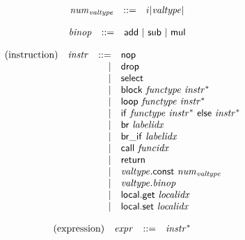 \documentclass{article}
\begin{document}
\vspace{1ex}

$$
\begin{array}{@{}lrrl@{}l@{}}
	& {{\mathit{num}}}_{{\mathit{valtype}}} &::=& {i}{{|{\mathit{valtype}}|}} \\
\end{array}
$$

\vspace{1ex}

$$
\begin{array}{@{}lrrl@{}l@{}}
	& {\mathit{binop}} &::=& \mathsf{add} ~|~ \mathsf{sub} ~|~ \mathsf{mul} \\
\end{array}
$$

\vspace{1ex}

$$
\begin{array}{@{}lrrl@{}l@{}}
	\mbox{(instruction)} & {\mathit{instr}} &::=& \mathsf{nop} \\ &&|&
	\mathsf{drop} \\ &&|&
	\mathsf{select} \\ &&|&
	\mathsf{block}~{\mathit{functype}}~{{\mathit{instr}}^\ast} \\ &&|&
	\mathsf{loop}~{\mathit{functype}}~{{\mathit{instr}}^\ast} \\ &&|&
	\mathsf{if}~{\mathit{functype}}~{{\mathit{instr}}^\ast}~\mathsf{else}~{{\mathit{instr}}^\ast} \\ &&|&
	\mathsf{br}~{\mathit{labelidx}} \\ &&|&
	\mathsf{br\_if}~{\mathit{labelidx}} \\ &&|&
	\mathsf{call}~{\mathit{funcidx}} \\ &&|&
	\mathsf{return} \\ &&|&
	{\mathit{valtype}}{.}\mathsf{const}~{{\mathit{num}}}_{{\mathit{valtype}}} \\ &&|&
	{\mathit{valtype}} {.} {\mathit{binop}} \\ &&|&
	\mathsf{local.get}~{\mathit{localidx}} \\ &&|&
	\mathsf{local.set}~{\mathit{localidx}} \\
\end{array}
$$

\vspace{1ex}

$$
\begin{array}{@{}lrrl@{}l@{}}
	\mbox{(expression)} & {\mathit{expr}} &::=& {{\mathit{instr}}^\ast} \\
\end{array}
$$
\end{document}
